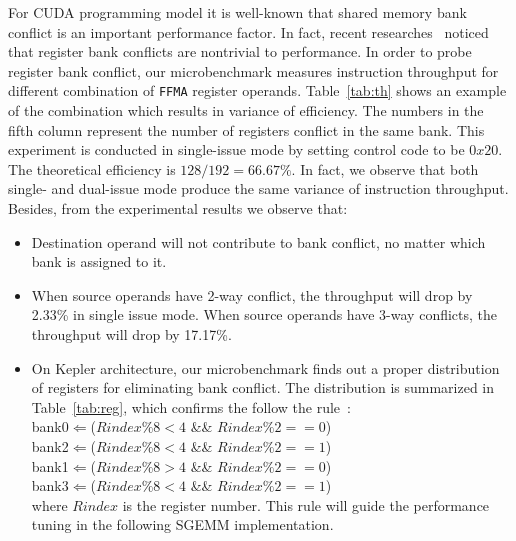 \documentclass{sig-alternate-05-2015}
\begin{document}
For CUDA programming model it is well-known that shared memory bank conflict is an important performance factor. In fact, recent researches~\cite{} noticed that register bank conflicts are nontrivial to performance.  In order to probe register bank conflict, our microbenchmark measures instruction throughput for different combination of {\tt FFMA} register operands. Table~\ref{tab:th} shows an example of the combination which results in variance of efficiency. The numbers in the fifth column represent the number of registers conflict in the same bank. This experiment is conducted in single-issue mode by setting control code to be $0x20$. The theoretical efficiency is $128/192=66.67\%$. In fact, we observe that both single- and dual-issue mode produce the same variance of instruction throughput. Besides, from the experimental results we observe that:
\begin{itemize}
\item Destination operand will not contribute to bank conflict, no matter which bank is assigned to it.
\item When source operands have 2-way conflict, the throughput will drop by 2.33\% in single issue
    mode. When source operands have 3-way conflicts, the throughput will drop by 17.17\%.

 \item On Kepler architecture, our microbenchmark finds out a proper distribution of registers for eliminating bank conflict. The distribution is summarized in Table~\ref{tab:reg}, which confirms the follow the rule~\cite{}: \\
 bank0$\Leftarrow$($Rindex \% 8 < 4$ \&\& $Rindex \% 2 == 0$) \\
 bank2$\Leftarrow$($Rindex \% 8 < 4$ \&\&
$Rindex \% 2 == 1$) \\
bank1$\Leftarrow$($Rindex \% 8 > 4$ \&\& $Rindex \%2 == 0$) \\
bank3$\Leftarrow$($Rindex \% 8 < 4$ \&\&
$Rindex\% 2 == 1$)\\
where $Rindex$ is the register number. This rule will guide the performance tuning in the following SGEMM implementation.

\end{itemize}
\end{document}
